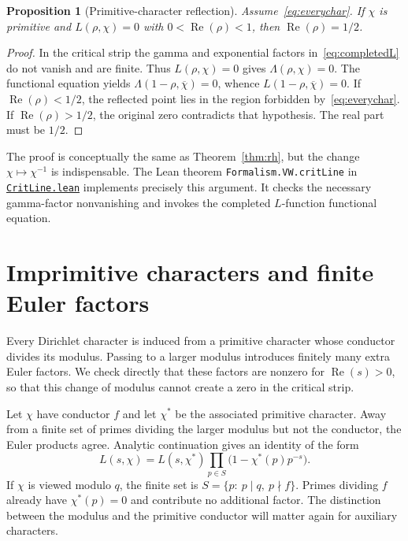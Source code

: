 \documentclass[11pt,openany,oneside]{scrbook}
\newtheorem{proposition}[theorem]{Proposition}
\theoremstyle{definition}
\theoremstyle{remark}
\newcommand{\Rea}{\operatorname{Re}}
\newcommand{\baseurl}{https://github.com/CocoSgt/riemann-hypothesis-lean/blob/7cbf7a0c32fca1badf05931879a37c3f8a2b03b4/}
\newcommand{\sourcefile}[2]{\href{\baseurl#1}{\texttt{#2}}}
\begin{document}
\begin{proposition}[Primitive-character reflection]\label{prop:primitive}
Assume~\eqref{eq:everychar}. If $\chi$ is primitive and $L(\rho,\chi)=0$ with $0<\Rea(\rho)<1$, then $\Rea(\rho)=1/2$.
\end{proposition}
\begin{proof}
In the critical strip the gamma and exponential factors in~\eqref{eq:completedL} do not vanish and are finite. Thus $L(\rho,\chi)=0$ gives $\Lambda(\rho,\chi)=0$. The functional equation yields $\Lambda(1-\rho,\overline\chi)=0$, whence $L(1-\rho,\overline\chi)=0$. If $\Rea(\rho)<1/2$, the reflected point lies in the region forbidden by~\eqref{eq:everychar}. If $\Rea(\rho)>1/2$, the original zero contradicts that hypothesis. The real part must be $1/2$.
\end{proof}

The proof is conceptually the same as Theorem~\ref{thm:rh}, but the change $\chi\mapsto\chi^{-1}$ is indispensable. The Lean theorem \texttt{Formalism.VW.critLine} in \sourcefile{src/Formalism/GammaFactorNonvanishing/CritLine.lean}{CritLine.lean} implements precisely this argument. It checks the necessary gamma-factor nonvanishing and invokes the completed $L$-function functional equation.

\section{Imprimitive characters and finite Euler factors}\label{sec:imprimitive-euler}
Every Dirichlet character is induced from a primitive character whose conductor divides its modulus. Passing to a larger modulus introduces finitely many extra Euler factors. We check directly that these factors are nonzero for $\Rea(s)>0$, so that this change of modulus cannot create a zero in the critical strip.

Let $\chi$ have conductor $f$ and let $\chi^*$ be the associated primitive character. Away from a finite set of primes dividing the larger modulus but not the conductor, the Euler products agree. Analytic continuation gives an identity of the form
\begin{equation}\label{eq:imprim}
L(s,\chi)=L(s,\chi^*)\prod_{p\in S}
\bigl(1-\chi^*(p)p^{-s}\bigr).
\end{equation}
If $\chi$ is viewed modulo $q$, the finite set is $S=\{p:\ p\mid q,\ p\nmid f\}$. Primes dividing $f$ already have $\chi^*(p)=0$ and contribute no additional factor. The distinction between the modulus and the primitive conductor will matter again for auxiliary characters.
\end{document}
